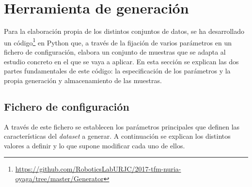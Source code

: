 \section{Herramienta de generación} \label{sec.generador}

Para la elaboración propia de los distintos conjuntos de datos,  se ha desarrollado un código\footnote{\url{https://github.com/RoboticsLabURJC/2017-tfm-nuria-oyaga/tree/master/Generator}} en Python que, a través de la fijación de varios parámetros en un fichero de configuración, elabora un conjunto de muestras que se adapta al estudio concreto en el que se vaya a aplicar. En esta sección se explican las dos partes fundamentales de este código: la especificación de los parámetros y la propia generación y almacenamiento de las muestras.

\subsection{Fichero de configuración} \label{ap.fichero}

A través de este fichero se establecen los parámetros principales que definen las características del \textit{dataset} a generar. A continuación se explican los distintos valores a definir y lo que supone modificar cada uno de ellos. 

